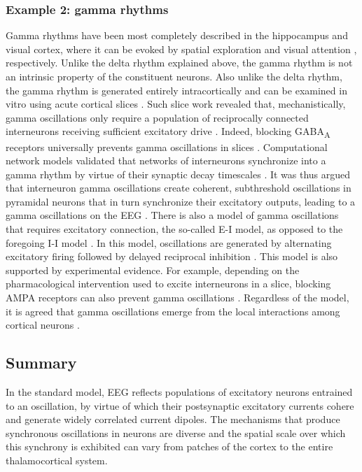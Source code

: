 \subsubsection{Example 2: gamma rhythms}
 Gamma rhythms have been most completely described in the hippocampus and visual cortex, where it can be evoked by spatial exploration \cite{Bragin1995} and visual attention \cite{Gray1989}, respectively. Unlike the delta rhythm explained above, the gamma rhythm is not an intrinsic property of the constituent neurons. Also unlike the delta rhythm, the gamma rhythm is generated entirely intracortically \cite{Gray1989} and can be examined in vitro using acute cortical slices \cite{Whittington1995}. Such slice work revealed that, mechanistically, gamma oscillations only require a population of reciprocally connected interneurons receiving sufficient excitatory drive \cite{Whittington1995, Buzski2012b}. Indeed, blocking GABA\textsubscript{A} receptors universally prevents gamma oscillations in slices \cite{Bartos2007}. Computational network models validated that networks of interneurons synchronize into a gamma rhythm by virtue of their synaptic decay timescales \cite{Wang1996}. It was thus argued that interneuron gamma oscillations create coherent, subthreshold oscillations in pyramidal neurons that in turn synchronize their excitatory outputs, leading to a gamma oscillations on the EEG \cite{Wang1996}. There is also a model of gamma oscillations that requires excitatory connection, the so-called E-I model, as opposed to the foregoing I-I model \cite{Buzski2012b}. In this model, oscillations are generated by alternating excitatory firing followed by delayed reciprocal inhibition \cite{Borgers2003}. This model is also supported by experimental evidence. For example, depending on the pharmacological intervention used to excite interneurons in a slice, blocking AMPA receptors can also prevent gamma oscillations \cite{Bartos2007}. Regardless of the model, it is agreed that gamma oscillations emerge from the local interactions among cortical neurons \cite{Bartos2007, Buzski2012b}.

\subsection{Summary}
In the standard model, EEG reflects populations of excitatory neurons entrained to an oscillation, by virtue of which their postsynaptic excitatory currents cohere and generate widely correlated current dipoles. The mechanisms that produce synchronous oscillations in neurons are diverse and the spatial scale over which this synchrony is exhibited can vary from patches of the cortex to the entire thalamocortical system. 

